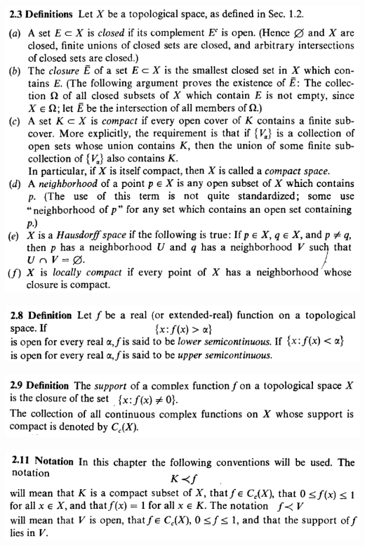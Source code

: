 \documentclass[12pt]{article}
\begin{document}
		\begin{center}
		\includegraphics{d2ponto3}
		\end{center}

		\begin{center}
		\includegraphics{d2ponto8}
		\end{center}

		\begin{center}
		\includegraphics{d2ponto9}
		\end{center}

		\begin{center}
		\includegraphics{d2ponto11}
		\end{center}
\end{document}
